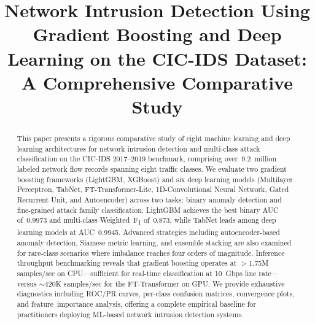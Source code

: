 \documentclass[conference]{IEEEtran}
\begin{document}
\title{%
  Network Intrusion Detection Using Gradient Boosting and Deep\\
  Learning on the CIC-IDS Dataset: A Comprehensive Comparative Study
}

\author{%
}

\maketitle

\begin{abstract}
This paper presents a rigorous comparative study of eight machine learning and
deep learning architectures for network intrusion detection and multi-class
attack classification on the CIC-IDS 2017--2019 benchmark, comprising
over~9.2~million labeled network flow records spanning eight traffic classes.
We evaluate two gradient boosting frameworks (LightGBM, XGBoost) and six
deep learning models (Multilayer Perceptron, TabNet, FT-Transformer-Lite,
1D-Convolutional Neural Network, Gated Recurrent Unit, and Autoencoder)
across two tasks: binary anomaly detection and fine-grained attack family
classification. LightGBM achieves the best binary AUC of~0.9973 and
multi-class Weighted~F\textsubscript{1} of~0.873, while TabNet leads among
deep learning models at AUC~0.9945. Advanced strategies including
autoencoder-based anomaly detection, Siamese metric learning, and ensemble
stacking are also examined for rare-class scenarios where imbalance reaches
four orders of magnitude. Inference throughput benchmarking reveals that
gradient boosting operates at $>$1.75M samples/sec on CPU—sufficient for
real-time classification at 10~Gbps line rate—versus $\sim$420K samples/sec
for the FT-Transformer on GPU. We provide exhaustive diagnostics including
ROC/PR curves, per-class confusion matrices, convergence plots, and
feature~importance analysis, offering a complete empirical baseline for
practitioners deploying ML-based network intrusion detection systems.
\end{abstract}
\end{document}
